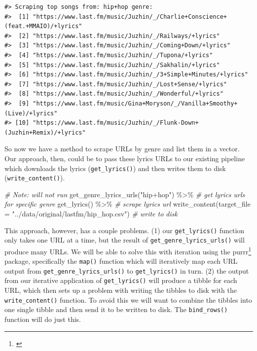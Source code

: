 \documentclass[
]{article}
\newenvironment{Shaded}{\begin{snugshade}}{\end{snugshade}}
\newcommand{\AttributeTok}[1]{\textcolor[rgb]{0.77,0.63,0.00}{#1}}
\newcommand{\CommentTok}[1]{\textcolor[rgb]{0.56,0.35,0.01}{\textit{#1}}}
\newcommand{\FunctionTok}[1]{\textcolor[rgb]{0.00,0.00,0.00}{#1}}
\newcommand{\NormalTok}[1]{#1}
\newcommand{\SpecialCharTok}[1]{\textcolor[rgb]{0.00,0.00,0.00}{#1}}
\newcommand{\StringTok}[1]{\textcolor[rgb]{0.31,0.60,0.02}{#1}}
\DeclareRobustCommand{\href}[2]{#2\footnote{\url{#1}}}
\begin{document}
\begin{verbatim}
#> Scraping top songs from: hip+hop genre:
#>  [1] "https://www.last.fm/music/Juzhin/_/Charlie+Conscience+(feat.+MMAIO)/+lyrics"
#>  [2] "https://www.last.fm/music/Juzhin/_/Railways/+lyrics"                        
#>  [3] "https://www.last.fm/music/Juzhin/_/Coming+Down/+lyrics"                     
#>  [4] "https://www.last.fm/music/Juzhin/_/Tupona/+lyrics"                          
#>  [5] "https://www.last.fm/music/Juzhin/_/Sakhalin/+lyrics"                        
#>  [6] "https://www.last.fm/music/Juzhin/_/3+Simple+Minutes/+lyrics"                
#>  [7] "https://www.last.fm/music/Juzhin/_/Lost+Sense/+lyrics"                      
#>  [8] "https://www.last.fm/music/Juzhin/_/Wonderful/+lyrics"                       
#>  [9] "https://www.last.fm/music/Gina+Moryson/_/Vanilla+Smoothy+(Live)/+lyrics"    
#> [10] "https://www.last.fm/music/Juzhin/_/Flunk-Down+(Juzhin+Remix)/+lyrics"
\end{verbatim}

So now we have a method to scrape URLs by genre and list them in a vector. Our approach, then, could be to pass these lyrics URLs to our existing pipeline which downloads the lyrics (\texttt{get\_lyrics()}) and then writes them to disk (\texttt{write\_content()}).

\begin{Shaded}
\begin{Highlighting}[]
\CommentTok{\# Note: will not run}
\FunctionTok{get\_genre\_lyrics\_urls}\NormalTok{(}\StringTok{"hip+hop"}\NormalTok{) }\SpecialCharTok{\%\textgreater{}\%} \CommentTok{\# get lyrics urls for specific genre}
  \FunctionTok{get\_lyrics}\NormalTok{() }\SpecialCharTok{\%\textgreater{}\%} \CommentTok{\# scrape lyrics url}
  \FunctionTok{write\_content}\NormalTok{(}\AttributeTok{target\_file =} \StringTok{"../data/original/lastfm/hip\_hop.csv"}\NormalTok{) }\CommentTok{\# write to disk}
\end{Highlighting}
\end{Shaded}

This approach, however, has a couple problems. (1) our \texttt{get\_lyrics()} function only takes one URL at a time, but the result of \texttt{get\_genre\_lyrics\_urls()} will produce many URLs. We will be able to solve this with iteration using the \href{}{purrr} package, specifically the \texttt{map()} function which will iteratively map each URL output from \texttt{get\_genre\_lyrics\_urls()} to \texttt{get\_lyrics()} in turn. (2) the output from our iterative application of \texttt{get\_lyrics()} will produce a tibble for each URL, which then sets up a problem with writing the tibbles to disk with the \texttt{write\_content()} function. To avoid this we will want to combine the tibbles into one single tibble and then send it to be written to disk. The \texttt{bind\_rows()} function will do just this.
\end{document}
